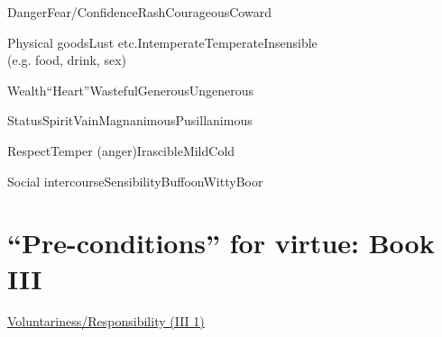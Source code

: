 \documentclass[11pt]{article}
\begin{document}
\noindent Danger\hspace*{22mm}Fear/Confidence\hspace*{10mm}Rash\hspace*{16mm}Courageous\hspace*{12mm}Coward
\vspace*{1mm}

\noindent Physical goods\hspace*{11mm}Lust etc.\hspace*{20mm}Intemperate\hspace*{8mm}Temperate\hspace*{13mm}Insensible\\\hspace*{2mm}(e.g. food, drink, sex)
\vspace*{1mm}

\noindent Wealth\hspace*{22mm}``Heart''\hspace*{22mm}Wasteful\hspace*{14mm}Generous\hspace*{12mm}Ungenerous
\vspace*{1mm}

\noindent Status\hspace*{24mm}Spirit\hspace*{27mm}Vain\hspace*{16mm}Magnanimous\hspace*{7mm}Pusillanimous
\vspace*{1mm}

\noindent Respect\hspace*{21mm}Temper (anger)\hspace*{11mm}Irascible\hspace*{16mm}Mild\hspace*{21mm}Cold
\vspace*{1mm}

\noindent Social intercourse\hspace*{6mm}Sensibility\hspace*{18mm}Buffoon\hspace*{16mm}Witty\hspace*{21mm}Boor

\section*{``Pre-conditions'' for virtue: Book III}

\noindent\underline{Voluntariness/Responsibility (III 1)}
\vspace*{2mm}
\end{document}
